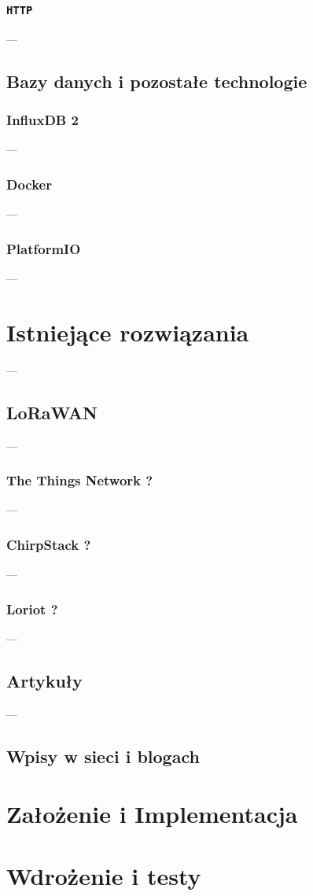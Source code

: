 \documentclass[a4paper,12pt]{book} %
\begin{document}
\subsection{\texttt{HTTP}}
---
\section{Bazy danych i pozostałe technologie}
\subsection{InfluxDB 2}
---
\subsection{Docker}
---
\subsection{PlatformIO}
---
\chapter{Istniejące rozwiązania}
---
\section{LoRaWAN}
---
\subsection{The Things Network ?}
---
\subsection{ChirpStack ?}
---
\subsection{Loriot ?}
---
\section{Artykuły}
---
\section{Wpisy w sieci i blogach}

\chapter{Założenie i Implementacja}
\chapter{Wdrożenie i testy}
\end{document}
